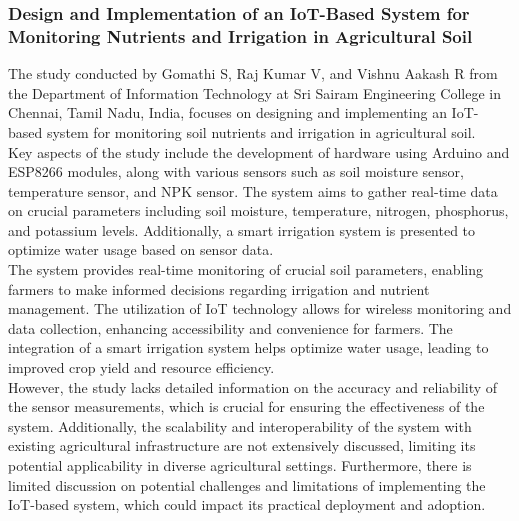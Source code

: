 \documentclass[12pt, a4paper]{article}
\begin{document}
\subsubsection{Design and Implementation of an IoT-Based System for Monitoring Nutrients and Irrigation in Agricultural Soil}
The study conducted by Gomathi S, Raj Kumar V, and Vishnu Aakash R\cite{gomathi2022design}  from the Department of Information Technology at Sri Sairam Engineering College in Chennai, Tamil Nadu, India, focuses on designing and implementing an IoT-based system for monitoring soil nutrients and irrigation in agricultural soil.\\
Key aspects of the study include the development of hardware using Arduino and ESP8266 modules, along with various sensors such as soil moisture sensor, temperature sensor, and NPK sensor. The system aims to gather real-time data on crucial parameters including soil moisture, temperature, nitrogen, phosphorus, and potassium levels. Additionally, a smart irrigation system is presented to optimize water usage based on sensor data.\\
The system provides real-time monitoring of crucial soil parameters, enabling farmers to make informed decisions regarding irrigation and nutrient management. The utilization of IoT technology allows for wireless monitoring and data collection, enhancing accessibility and convenience for farmers. The integration of a smart irrigation system helps optimize water usage, leading to improved crop yield and resource efficiency.\\
However, the study lacks detailed information on the accuracy and reliability of the sensor measurements, which is crucial for ensuring the effectiveness of the system. Additionally, the scalability and interoperability of the system with existing agricultural infrastructure are not extensively discussed, limiting its potential applicability in diverse agricultural settings. Furthermore, there is limited discussion on potential challenges and limitations of implementing the IoT-based system, which could impact its practical deployment and adoption.
\end{document}
